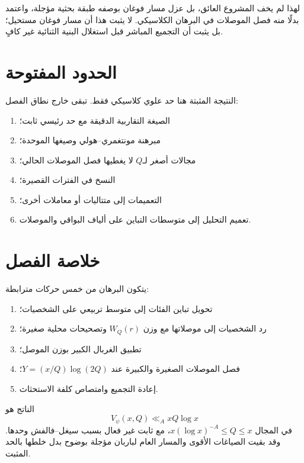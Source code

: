 لهذا لم يخف المشروع العائق، بل عزل مسار فوغان بوصفه طبقة بحثية مؤجلة، واعتمد
بدلًا منه فصل الموصلات في البرهان الكلاسيكي. لا يثبت هذا أن مسار فوغان
مستحيل؛ بل يثبت أن التجميع المباشر قبل استغلال البنية الثنائية غير كافٍ.

\section{الحدود المفتوحة}

النتيجة المثبتة هنا حد علوي كلاسيكي فقط. تبقى خارج نطاق الفصل:
\begin{enumerate}
  \item الصيغة التقاربية الدقيقة مع حد رئيسي ثابت؛
  \item مبرهنة مونتغمري--هولي وصيغها الموحدة؛
  \item مجالات أصغر لـ\(Q\) لا يغطيها فصل الموصلات الحالي؛
  \item النسخ في الفترات القصيرة؛
  \item التعميمات إلى متتاليات أو معاملات أخرى؛
  \item تعميم التحليل إلى متوسطات التباين على ألياف البواقي والموصلات.
\end{enumerate}

\section{خلاصة الفصل}

يتكون البرهان من خمس حركات مترابطة:
\begin{enumerate}
  \item تحويل تباين الفئات إلى متوسط تربيعي على الشخصيات؛
  \item رد الشخصيات إلى موصلاتها مع وزن \(W_Q(r)\) وتصحيحات محلية صغيرة؛
  \item تطبيق الغربال الكبير بوزن الموصل؛
  \item فصل الموصلات الصغيرة والكبيرة عند \(Y=(x/Q)\log(2Q)\)؛
  \item إعادة التجميع وامتصاص كلفة الاستحثاث.
\end{enumerate}
الناتج هو
\[
V_\psi(x,Q)\ll_A xQ\log x
\]
في المجال \(x(\log x)^{-A}\le Q\le x\)، مع ثابت غير فعال بسبب
سيغل--فالفش وحدها. وقد بقيت الصياغات الأقوى والمسار العام لباربان مؤجلة
بوضوح بدل خلطها بالحد المثبت.

